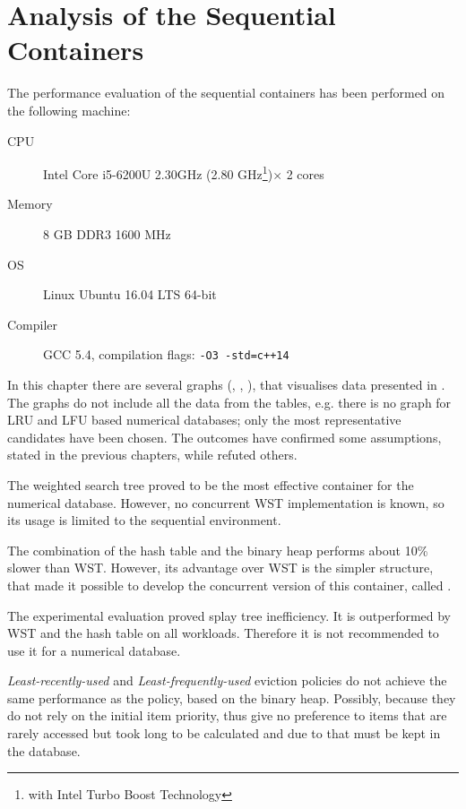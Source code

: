 \section{Analysis of the Sequential Containers}

\label{sec:secanalysis}

The performance evaluation of the sequential containers has been performed on the following machine:

\begin{description}
    \item [CPU] Intel\textsuperscript{\textregistered{}} Core\textsuperscript{\texttrademark{}} i5-6200U
    2.30GHz (2.80 GHz\footnote{with Intel\textsuperscript{\textregistered{}} Turbo Boost Technology})$ \times$ 2 cores
    \item [Memory] 8 GB DDR3 1600 MHz
    \item [OS] Linux\textsuperscript{\textregistered{}} Ubuntu\textsuperscript{\textregistered{}} 16.04 LTS 64-bit
    \item [Compiler] GCC 5.4, compilation flags: \texttt{-O3 -std=c++14}
    \end{description}

In this chapter there are several graphs (, , ), that visualises data presented in . The graphs do not include all the data from the tables, e.g. there is no graph for LRU and LFU based numerical databases; only the most representative candidates have been chosen. The outcomes have confirmed some assumptions, stated in the previous chapters, while refuted others.

The weighted search tree proved to be the most effective container for the numerical database. However, no concurrent WST implementation is known, so its usage is limited to the sequential environment.

The combination of the hash table and the binary heap performs about 10\% slower than WST. However, its advantage over WST is the simpler structure, that made it possible to develop the concurrent version of this container, called \cndcname.

The experimental evaluation proved splay tree inefficiency. It is outperformed by WST and the hash table on all workloads. Therefore it is not recommended to use it for a numerical database.

\emph{Least-recently-used} and \emph{Least-frequently-used} eviction policies do not achieve the same performance as the policy, based on the binary heap. Possibly, because they do not rely on the initial item priority, thus give no preference to items that are rarely accessed  but took long to be calculated and due to that must be kept in the database.


